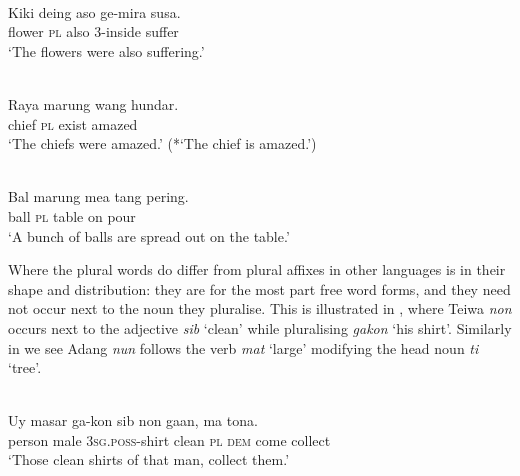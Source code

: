 \ea%
\label{ex:9:5}
 \\
\gll Kiki deing aso ge-mira susa. \\
  flower \textsc{pl} also 3-inside suffer  \\
\glt `The flowers were also suffering.'
 \z








\ea%
\label{ex:9:6}
 \\
\gll  Raya marung wang hundar. \\
   chief \textsc{pl} exist amazed  \\
\glt `The chiefs were amazed.' (*`The chief is amazed.')
\z







\ea%
\label{ex:9:7}
 \\
\gll Bal  marung mea tang pering.  \\
  ball \textsc{pl} table on pour   \\
\glt `A bunch of balls are spread out on the table.'
\z







Where the plural words do differ from plural affixes in other languages is in their shape and distribution: they are for the most part free word forms, and they need not occur next to the noun they pluralise. This is illustrated in , where Teiwa \textit{non} occurs next to the adjective \textit{sib} `clean' while pluralising \textit{gakon} `his shirt'. Similarly in  we see Adang \textit{nun} follows the verb \textit{mat}\textit{{\textepsilon}} `large' modifying the head noun \textit{ti} `tree'.


\ea%
 \\
\label{ex:9:8}
\gll  Uy masar ga-kon  sib non ga{{\textglotstop}}{an,} ma {tona}{{\textglotstop}}{.}\\
   person male \textsc{3sg.poss}-shirt clean \textsc{pl} \textsc{dem} come collect\\
\glt `Those clean shirts of that man, collect them.'
\z







